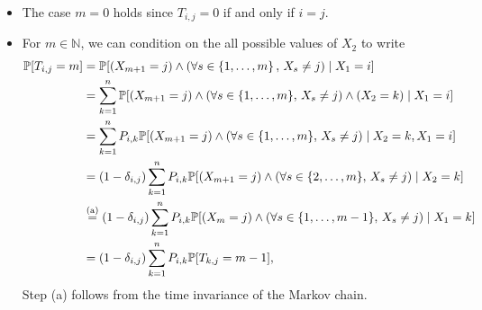 \documentclass[11pt,twoside]{report}
\newcommand{\bbN}{{\mathbb{N}}}
\begin{document}
\begin{itemize}
\begin{itemize}
\item The case $m = 0$ holds since $T_{i,j} = 0$ if and  only if $i = j$. 
\item For $m  \in \bbN$, we can condition on the all possible values of $X_2$ to write
\begin{align*}
 \pr{ T_{i,j}=m}
& =  \pr{ ( X_{m+1}=j ) \wedge ( \forall s \in \{ 1, \dots, m\}  \,, \,   X_{s}\ne j )   \mid X_{1}=i } \\
& =  \sum_{k=1}^n  \pr{ ( X_{m+1}=j ) \wedge ( \forall s \in \{ 1, \dots, m\}, \,   X_{s}\ne j ) \wedge (X_2 = k)   \mid X_{1}=i } \\
&=\sum_{k=1}^n  P_{i,k}  \pr{ ( X_{m+1}=j ) \wedge ( \forall s \in \{ 1, \dots, m\} , \,   X_{s}\ne j )   \mid X_{2}=k , X_1  = i } \\
& =  (1 - \delta_{i,j}) \sum_{k=1}^n  P_{i,k}  \pr{ ( X_{m+1}=j ) \wedge ( \forall s \in \{ 2, \dots, m\} , \,   X_{s}\ne j )   \mid X_{2}=k  } \\
&\overset{\mathrm{(a)}}{ =}    (1 - \delta_{i,j}) \sum_{k=1}^n  P_{i,k}  \pr{ ( X_{m}=j ) \wedge ( \forall s \in \{ 1, \dots, m-1\} , \,   X_{s}\ne j )   \mid X_{1}=k  } \\
& =  (1 - \delta_{i,j}) \sum_{k=1}^n  P_{i,k}  \pr{ T_{k,j} = m -1 } , 
\end{align*}
Step (a) follows from the time invariance of the Markov chain. 
%
%

\end{itemize}
\end{itemize}
\end{document}
